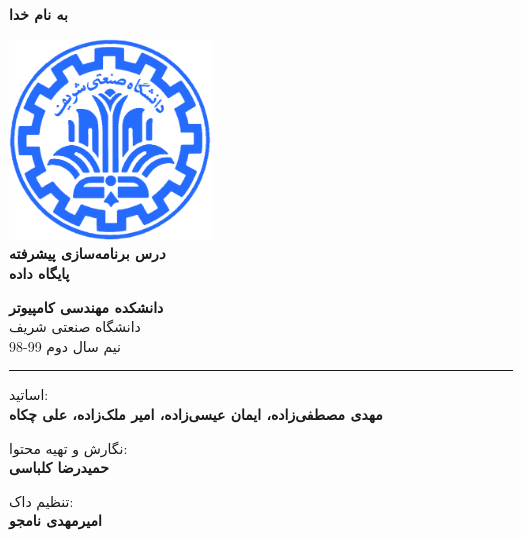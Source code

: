 \documentclass[]{article}
\begin{document}
\begin{titlepage}
\begin{center}

\textbf{ \Huge{به نام خدا} }
        
\vspace{0.2cm}

\includegraphics[width=0.4\textwidth]{sharif1.png}\\
\vspace{0.2cm}
\textbf{ \Huge{\emph درس برنامه‌سازی پیشرفته} }\\
\vspace{0.25cm}
\textbf{ \Large{پایگاه داده} }
\vspace{0.2cm}
       
 
      \large \textbf{دانشکده مهندسی کامپیوتر}\\\vspace{0.1cm}
    \large   دانشگاه صنعتی شریف\\\vspace{0.2cm}
       \large   ﻧﯿﻢ سال دوم 99-98 \\\vspace{0.10cm}
      \noindent\rule[1ex]{\linewidth}{1pt}
اساتید:\\
    \textbf{{مهدی مصطفی‌زاده، ایمان عیسی‌زاده، امیر ملک‌زاده، علی چکاه}}



        \vspace{0.10cm}
نگارش و تهیه محتوا:\\
    \textbf{{حمیدرضا کلباسی}}
    
       \vspace{0.10cm}
       تنظیم داک:\\
    \textbf{{امیرمهدی نامجو}}

    
        \vspace{0.05cm}

\end{center}
\end{titlepage}
\end{document}
